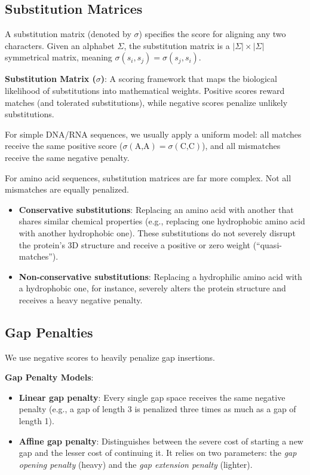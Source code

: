 \subsection{Substitution Matrices}

A substitution matrix (denoted by $\sigma$) specifies the score for aligning any two characters. Given an alphabet $\Sigma$, the substitution matrix is a $|\Sigma| \times |\Sigma|$ symmetrical matrix, meaning $\sigma(s_i, s_j) = \sigma(s_j, s_i)$. 

\begin{important}
    \textbf{Substitution Matrix ($\sigma$)}: A scoring framework that maps the biological likelihood of substitutions into mathematical weights. Positive scores reward matches (and tolerated substitutions), while negative scores penalize unlikely substitutions.
\end{important}

For simple DNA/RNA sequences, we usually apply a uniform model: all matches receive the same positive score ($\sigma(\text{A,A}) = \sigma(\text{C,C})$), and all mismatches receive the same negative penalty.

For amino acid sequences, substitution matrices are far more complex. Not all mismatches are equally penalized. 
\begin{itemize}
    \item \textbf{Conservative substitutions}: Replacing an amino acid with another that shares similar chemical properties (e.g., replacing one hydrophobic amino acid with another hydrophobic one). These substitutions do not severely disrupt the protein's 3D structure and receive a positive or zero weight (``quasi-matches'').
    \item \textbf{Non-conservative substitutions}: Replacing a hydrophilic amino acid with a hydrophobic one, for instance, severely alters the protein structure and receives a heavy negative penalty.
\end{itemize}

\subsection{Gap Penalties}

We use negative scores to heavily penalize gap insertions. 

\begin{important}
    \textbf{Gap Penalty Models}:
    \begin{itemize}
        \item \textbf{Linear gap penalty}: Every single gap space receives the same negative penalty (e.g., a gap of length 3 is penalized three times as much as a gap of length 1).
        \item \textbf{Affine gap penalty}: Distinguishes between the severe cost of starting a new gap and the lesser cost of continuing it. It relies on two parameters: the \textit{gap opening penalty} (heavy) and the \textit{gap extension penalty} (lighter).
    \end{itemize}
\end{important}

